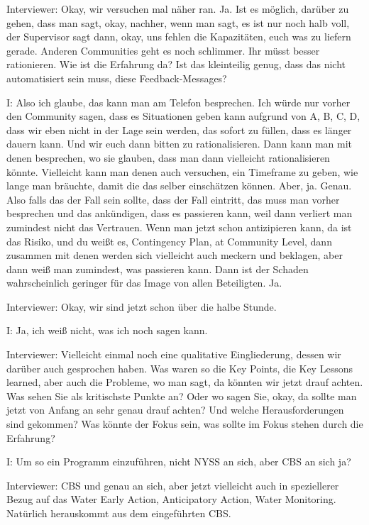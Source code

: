 Interviewer: Okay, wir versuchen mal n{\"a}her ran. Ja. Ist es m{\"o}glich, dar{\"u}ber zu gehen, dass man sagt, okay, nachher, wenn man sagt, es ist nur noch halb voll, der Supervisor sagt dann, okay, uns fehlen die Kapazit{\"a}ten, euch was zu liefern gerade. Anderen Communities geht es noch schlimmer. Ihr m{\"u}sst besser rationieren. Wie ist die Erfahrung da? Ist das kleinteilig genug, dass das nicht automatisiert sein muss, diese Feedback-Messages?

I: Also ich glaube, das kann man am Telefon besprechen. Ich w{\"u}rde nur vorher den Community sagen, dass es Situationen geben kann aufgrund von A, B, C, D, dass wir eben nicht in der Lage sein werden, das sofort zu f{\"u}llen, dass es l{\"a}nger dauern kann. Und wir euch dann bitten zu rationalisieren. Dann kann man mit denen besprechen, wo sie glauben, dass man dann vielleicht rationalisieren k{\"o}nnte. Vielleicht kann man denen auch versuchen, ein Timeframe zu geben, wie lange man br{\"a}uchte, damit die das selber einsch{\"a}tzen k{\"o}nnen. Aber, ja. Genau. Also falls das der Fall sein sollte, dass der Fall eintritt, das muss man vorher besprechen und das ank{\"u}ndigen, dass es passieren kann, weil dann verliert man zumindest nicht das Vertrauen. Wenn man jetzt schon antizipieren kann, da ist das Risiko, und du weißt es, Contingency Plan, at Community Level, dann zusammen mit denen werden sich vielleicht auch meckern und beklagen, aber dann weiß man zumindest, was passieren kann. Dann ist der Schaden wahrscheinlich geringer f{\"u}r das Image von allen Beteiligten. Ja. 

Interviewer: Okay, wir sind jetzt schon {\"u}ber die halbe Stunde. 

I: Ja, ich weiß nicht, was ich noch sagen kann.

Interviewer: Vielleicht einmal noch eine qualitative Eingliederung, dessen wir dar{\"u}ber auch gesprochen haben. Was waren so die Key Points, die Key Lessons learned, aber auch die Probleme, wo man sagt, da k{\"o}nnten wir jetzt drauf achten. Was sehen Sie als kritischste Punkte an? Oder wo sagen Sie, okay, da sollte man jetzt von Anfang an sehr genau drauf achten? Und welche Herausforderungen sind gekommen? Was k{\"o}nnte der Fokus sein, was sollte im Fokus stehen durch die Erfahrung?

I:  Um so ein Programm einzuf{\"u}hren, nicht NYSS an sich, aber CBS an sich ja?

Interviewer: CBS und genau an sich, aber jetzt vielleicht auch in speziellerer Bezug auf das Water Early Action, Anticipatory Action, Water Monitoring. Nat{\"u}rlich herauskommt aus dem eingef{\"u}hrten CBS. 

